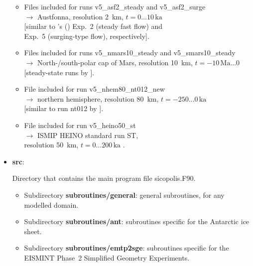 \documentclass[12pt,a4paper]{article}
\begin{document}
\begin{itemize}
\begin{itemize}
\item
Files included for runs v5\_asf2\_steady and v5\_asf2\_surge
\\
$\longrightarrow$ Austfonna, resolution 2~km, $t=0\ldots{}10\,\mathrm{ka}$
\\
\phantom{$\longrightarrow$} [similar to \citeauthor{dunse_etal_2011}'s (\citeyear{dunse_etal_2011}) Exp.~2 (steady fast flow) and
\\
\phantom{$\longrightarrow$} Exp.~5 (surging-type flow), respectively].

\item
Files included for runs v5\_nmars10\_steady and v5\_smars10\_steady
\\
$\longrightarrow$ North-/south-polar cap of Mars, resolution 10~km, $t=-10\,\mathrm{Ma}\ldots{}0$
\\
\phantom{$\longrightarrow$} [steady-state runs by \citet{greve_2007b}].

\item
File included for run v5\_nhem80\_nt012\_new
\\
$\longrightarrow$ northern hemisphere, resolution 80~km, $t=-250\ldots{}0\,\mathrm{ka}$
\\
\phantom{$\longrightarrow$} [similar to run nt012 by \citet{greve_etal_1999a}].

\item
File included for run v5\_heino50\_st
\\
$\longrightarrow$ ISMIP HEINO standard run ST,
\\
\phantom{$\longrightarrow$} resolution 50~km, $t=0\ldots{}200\,\mathrm{ka}$ \citep{calov_etal_2010}.

\end{itemize}

\item \textbf{src}:

Directory that contains the main program file sicopolis.F90.

\begin{itemize}

\item
Subdirectory \textbf{subroutines/general}: general subroutines, for any modelled domain.

\item
Subdirectory \textbf{subroutines/ant}: subroutines specific for the Antarctic ice sheet.

\item
Subdirectory \textbf{subroutines/emtp2sge}: subroutines specific for the EISMINT Phase~2 Simplified Geometry Experiments.


\end{itemize}
\end{itemize}
\end{document}

